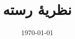 \documentclass[12pt]{article}
\begin{document}
\title{نظریهٔ رسته}
\author{}
\date{\today}

\maketitle

\end{document}
